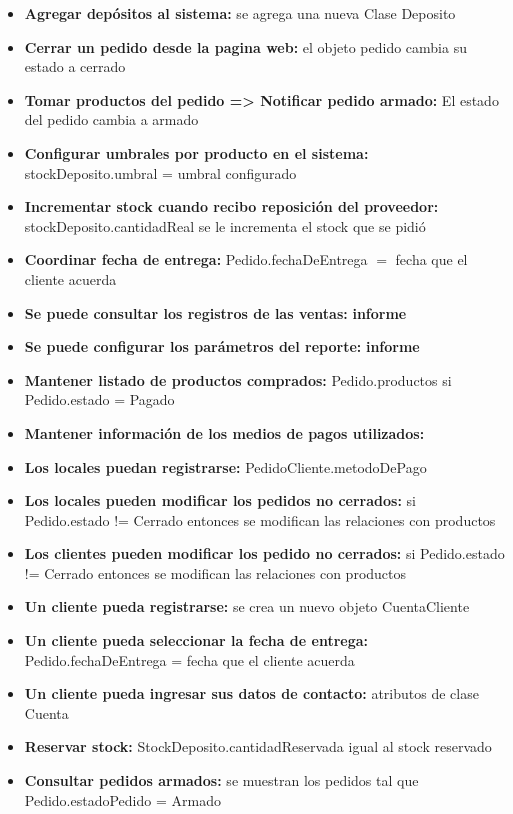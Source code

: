 \begin{itemize}
\item \textbf{Agregar depósitos al sistema:} se agrega una nueva  Clase Deposito 
\item \textbf{Cerrar un pedido desde la pagina web:} el objeto pedido cambia su estado a cerrado
\item \textbf{Tomar productos del pedido => Notificar pedido armado:}  El estado del pedido cambia a armado
\item \textbf{Configurar umbrales por producto en el sistema:}  stockDeposito.umbral = umbral configurado
\item \textbf{Incrementar stock cuando recibo reposición del proveedor:}  stockDeposito.cantidadReal se le incrementa el stock que se pidió
\item \textbf{Coordinar fecha de entrega:}  Pedido.fechaDeEntrega $=$ fecha que el cliente acuerda
\item \textbf{Se puede consultar los registros de las ventas:}  \textbf{informe}
\item \textbf{Se puede configurar los parámetros del reporte:}  \textbf{informe}
\item \textbf{Mantener listado de productos comprados:}  Pedido.productos si Pedido.estado = Pagado
\item \textbf{Mantener información de los medios de pagos utilizados:}  
\item \textbf{Los locales puedan registrarse:}  PedidoCliente.metodoDePago
\item \textbf{Los locales pueden modificar los pedidos no cerrados:}  si Pedido.estado != Cerrado entonces se modifican las relaciones con productos
\item \textbf{Los clientes pueden modificar los pedido no cerrados:}  si Pedido.estado != Cerrado entonces se modifican las relaciones con productos
\item \textbf{Un cliente pueda registrarse:}  se crea un nuevo objeto CuentaCliente
\item \textbf{Un cliente pueda seleccionar la fecha de entrega:}  Pedido.fechaDeEntrega = fecha que el cliente acuerda
\item \textbf{Un cliente pueda ingresar sus datos de contacto:}  atributos de clase Cuenta
\item \textbf{Reservar stock:}  StockDeposito.cantidadReservada igual al stock reservado
\item \textbf{Consultar pedidos armados:}  se muestran los pedidos tal que Pedido.estadoPedido = Armado

\end{itemize}
